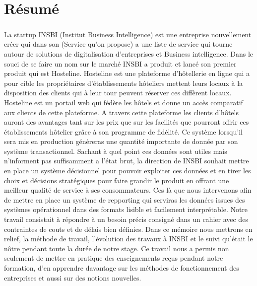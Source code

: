 \chapter{Résumé}


\paragraph{}
	La startup INSBI (Institut Business Intelligence) est une entreprise nouvellement créer qui dans son (Service qu’on propose) a une liste de service qui tourne autour de solutions de digitalisation d’entreprises et Business intelligence. Dans le souci de se faire un nom sur le marché INSBI a produit et lancé son premier produit qui est Hosteline. Hosteline est une plateforme d’hôtellerie en ligne qui a pour cible les propriétaires d’établissements hôteliers  mettent leurs locaux à la disposition des clients qui à leur tour peuvent réserver ces diffèrent locaux. Hosteline est un portail web qui fédère les hôtels et donne un accès comparatif aux clients de cette plateforme. A travers cette plateforme les clients d’hôtels auront des avantages tant sur les prix que sur les facilités que pourront offrir ces établissements hôtelier grâce à son programme de fidélité. Ce système lorsqu’il sera mis en production génèreras une quantité importante de donnée par son système transactionnel. Sachant à quel point ces données sont utiles mais n’informent pas suffisamment a l’état brut, la direction de INSBI souhait mettre en place un système décisionnel pour pouvoir exploiter ces données et en tirer les choix et décisions stratégiques pour faire grandir le produit en offrant une meilleur qualité de service à ses consommateurs. Ces là que nous intervenons afin de mettre en place un système de repporting qui serviras les données issues des systèmes opérationnel dans des formats lisible et facilement interprétable. Notre travail consistait à répondre à un besoin précis consigné dans un cahier avec des contraintes de couts et de délais bien définies. Dans ce mémoire nous mettrons en relief, la méthode de travail, l’évolution des travaux à INSBI et le suivi qu’était le nôtre pendant toute la durée de notre stage. Ce travail nous a permis non seulement de mettre en pratique des enseignements reçus pendant notre formation, d’en apprendre davantage sur les méthodes de fonctionnement des entreprises et aussi sur des notions nouvelles.



